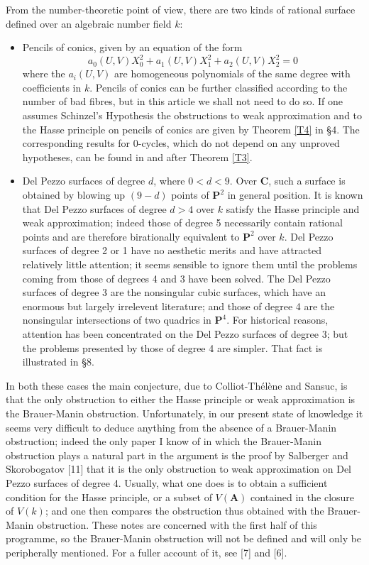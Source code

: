 \documentclass[12pt]{article}
\def\bA{{\mathbf A}}
\def\bC{{\mathbf C}}
\def\bP{{\mathbf P}}
\def\beq{\begin{equation} \label}
\begin{document}
{From} the number-theoretic point of view, there are two kinds of rational
surface defined over an algebraic number field $k$:
\begin{itemize}
\item Pencils of conics, given by an equation of the form
\beq{E1} a_0(U,V)X_0^2+a_1(U,V)X_1^2+a_2(U,V)X_2^2=0 \end{equation}
where the $a_i(U,V)$ are homogeneous polynomials of the same degree with
coefficients in $k$. Pencils
of conics can be further classified according to the number of bad
fibres, but in this article we shall not need to do so. If one assumes
Schinzel's Hypothesis the obstructions to weak approximation and to the Hasse
principle on pencils of conics are given by Theorem \ref{T4} in \S4. The
corresponding results for 0-cycles, which do not depend on any unproved
hypotheses, can be found in and after Theorem \ref{T3}.
\item Del Pezzo surfaces of degree $d$, where $0<d<9$. Over $\bC$, such a
surface is obtained by blowing up $(9-d)$ points of $\bP^2$ in general
position. It is known that Del Pezzo surfaces of degree $d>4$
over $k$ satisfy the
Hasse principle and weak approximation; indeed those of degree 5 necessarily
contain rational points and are therefore birationally equivalent to
$\bP^2$ over $k$. Del Pezzo surfaces of degree 2 or 1
have no aesthetic merits and have attracted relatively little attention;
it seems sensible to ignore
them until the problems coming from those of degrees 4 and 3 have been solved.
The Del Pezzo surfaces of degree 3 are the nonsingular cubic
surfaces, which have an enormous but largely irrelevent literature;
and those of degree 4 are the nonsingular intersections of
two quadrics in $\bP^4$. For historical reasons, attention has been
concentrated on the Del Pezzo
surfaces of degree 3; but the problems presented by those
of degree 4 are simpler. That fact is illustrated in \S8.
\end{itemize}
In both these cases the main conjecture, due to Colliot-Th\'{e}l\`{e}ne and
Sansuc, is that the only obstruction to either the Hasse principle or weak
approximation is the Brauer-Manin obstruction. Unfortunately, in our present
state of knowledge it seems
very difficult to deduce anything from the absence of a Brauer-Manin
obstruction; indeed the only paper I know of in which the Brauer-Manin
obstruction plays a natural part in the argument is the proof by Salberger
and Skorobogatov [11] that it is the only obstruction to weak approximation on
Del Pezzo surfaces of degree 4. Usually, what one does is to
obtain a sufficient condition for the Hasse principle, or a subset of $V(\bA)$
contained in the closure of $V(k)$; and one then compares the obstruction
thus obtained with the Brauer-Manin obstruction. These notes are concerned
with the first half of this programme, so the Brauer-Manin obstruction will
not be defined and will only be peripherally mentioned. For a fuller account
of it, see [7] and [6].
\end{document}
